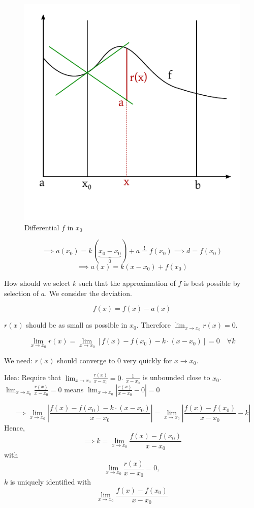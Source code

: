 \documentclass[a4paper,landscape,twocolumn]{article}
\theoremstyle{definition}
\newcommand\abs[1]{\left|#1\right|}
\begin{document}
\begin{figure}[!t]
  \begin{center}
    \includegraphics{img/differential.pdf}
    \caption{Differential $f$ in $x_0$}
    \label{img:differential}
  \end{center}
\end{figure}

\[ \implies a(x_0) = k (\underbrace{x_0 - x_0}_{0}) + a \overset!= f(x_0) \implies d = f(x_0) \]
\[ \implies a(x) = k (x - x_0) + f(x_0) \]

How should we select $k$ such that the approximation of $f$ is best possible by selection of $a$.
We consider the deviation.

\[ f(x) = f(x) - a(x) \]

$r(x)$ should be as small as possible in $x_0$.
Therefore $\lim_{x \to x_0} r(x) = 0$.

\[ \lim_{x \to x_0} r(x) = \lim_{x \to x_0} [f(x) - f(x_0) - k \cdot (x - x_0)] = 0 \quad\forall k \]

We need: $r(x)$ should converge to $0$ very quickly for $x \to x_0$.

Idea: Require that $\lim_{x \to x_0} \frac{r(x)}{x - x_0} = 0$.
$\frac1{x - x_0}$ is unbounded close to $x_0$. $\lim_{x \to x_0} \frac{r(x)}{x - x_0} = 0$ means
$\lim_{x \to x_0} \abs{\frac{r(x)}{x - x_0} - 0} = 0$

\[
  \implies \lim_{x \to x_0}
  \abs{\frac{f(x) - f(x_0) - k \cdot (x - x_0)}{x - x_0}}
  = \lim_{x \to x_0} \abs{\frac{f(x) - f(x_0)}{x - x_0} - k}
\]
Hence,
\[
  \implies k = \lim_{x \to x_0} \frac{f(x) - f(x_0)}{x - x_0}
\]
with
\[ \lim_{x \to x_0} \frac{r(x)}{x - x_0} = 0, \]
$k$ is uniquely identified with
\[ \lim_{x \to x_0} \frac{f(x) - f(x_0)}{x - x_0} \]
\end{document}

